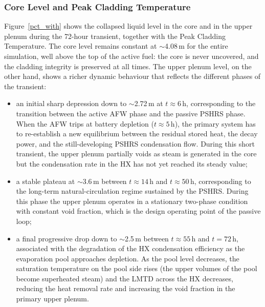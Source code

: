\documentclass[a4paper,11pt]{article}
\numberwithin{subsubsection}{subsection}
\numberwithin{subsection}{section}
\begin{document}
\subsubsection{Core Level and Peak Cladding Temperature} 
Figure~\ref{pct_with} shows the collapsed liquid level
in the core and in the upper plenum during the 72-hour transient, together with the Peak Cladding Temperature.
The core level remains constant at $\sim$4.08\,m for the entire
simulation, well above the top of the active fuel: the core
is never uncovered, and the cladding integrity is preserved at
all times. The upper plenum level, on the other hand, shows a
richer dynamic behaviour that reflects the different phases of
the transient:
\begin{itemize}
  \item an initial sharp depression down to $\sim$2.72\,m at
        $t \approx 6$\,h, corresponding to the transition between
        the active AFW phase and the passive PSHRS phase. When
        the AFW trips at battery depletion ($t \approx 5$\,h),
        the primary system has to re-establish a new equilibrium
        between the residual stored heat, the decay power, and
        the still-developing PSHRS condensation flow. During this
        short transient, the upper plenum partially voids as
        steam is generated in the core but the condensation rate
        in the HX has not yet reached its steady value;
  \item a stable plateau at $\sim$3.6\,m between $t \approx 14$\,h
        and $t \approx 50$\,h, corresponding to the long-term
        natural-circulation regime sustained by the PSHRS. During
        this phase the upper plenum operates in a stationary
        two-phase condition with constant void fraction, which is
        the design operating point of the passive loop;
  \item a final progressive drop down to $\sim$2.5\,m between
        $t \approx 55$\,h and $t = 72$\,h, associated with the
        degradation of the HX condensation efficiency as the
        evaporation pool approaches depletion. As the pool level
        decreases, the saturation temperature on the pool side
        rises (the upper volumes of the pool become superheated
        steam) and the LMTD across the HX decreases, reducing the
        heat removal rate and increasing the void fraction in the
        primary upper plenum.
\end{itemize}
\end{document}
